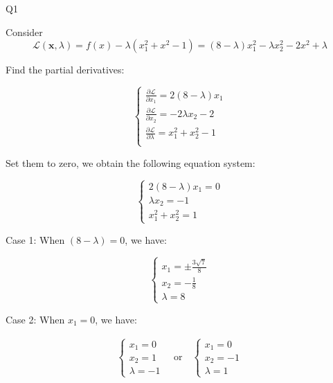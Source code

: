 \question Q1\droppoints

\begin{solution}
     Consider
    \[
        \mathcal{L(\mathbf{x}, \lambda)} = f(x) - \lambda(x_1^2 + x^2 - 1) = (8-\lambda)x_1^2 - \lambda x_2^2 - 2x^2 + \lambda
    \]

    Find the partial derivatives:

    \begin{equation*}
        \begin{cases}
            \frac{\partial \mathcal{L}}{\partial x_1} = 2(8 - \lambda)x_1 \\
            \frac{\partial \mathcal{L}}{\partial x_2} = -2\lambda x_2 - 2 \\
            \frac{\partial \mathcal{L}}{\partial \lambda} = x_1^2 + x_2^2 - 1 \\
        \end{cases}\label{eq:1}
    \end{equation*}

    Set them to zero, we obtain the following equation system:

    \begin{equation*}
        \begin{cases}
            2(8 - \lambda) x_ 1 = 0 \\
            \lambda x_2 = -1 \\
            x_1^2 + x_2^2 = 1
        \end{cases}\label{eq:2}
    \end{equation*}

    Case 1: When $(8 - \lambda) = 0$, we have:

    \begin{equation*}
        \begin{cases}
            x_1 = \pm \frac{3\sqrt{7}}{8} \\
            x_2 = -\frac{1}{8} \\
            \lambda = 8
        \end{cases}\label{eq:3}
    \end{equation*}

    Case 2: When $x_1 = 0$, we have:

    \begin{equation*}
        \begin{array}{c}
            \begin{cases}
                x_1 = 0 \\
                x_2 = 1 \\
                \lambda = -1
            \end{cases}
            \quad \text{or} \quad
            \begin{cases}
                x_1 = 0 \\
                x_2 = -1 \\
                \lambda = 1
            \end{cases}
        \end{array}
    \end{equation*}


\end{solution}
